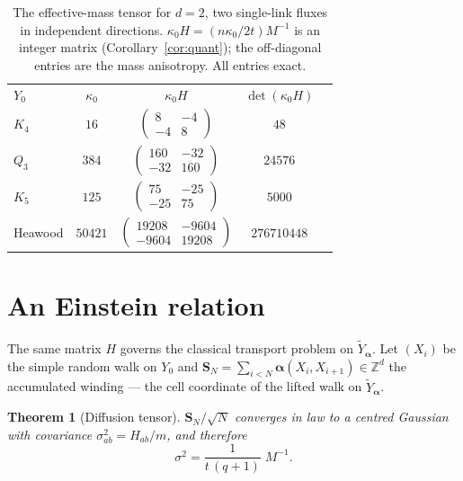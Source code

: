 \documentclass[aps,prb,reprint,amsmath,amssymb,floatfix,superscriptaddress]{revtex4-2}
\theoremstyle{plain}
\newtheorem{theorem}{Theorem}
\theoremstyle{definition}
\theoremstyle{remark}
\newcommand{\Z}{\mathbb{Z}}
\newcommand{\Yt}{\widetilde Y_{\bm\alpha}}
\begin{document}
\begin{table}[t]
\centering
\begin{ruledtabular}
\begin{tabular}{lcccc}
$Y_0$ & $\kappa_0$ & $\kappa_0H$ & $\det(\kappa_0H)$\\
\colrule
$K_4$    & $16$    & $\left(\begin{smallmatrix}8&-4\\-4&8\end{smallmatrix}\right)$ & $48$\\[2pt]
$Q_3$    & $384$   & $\left(\begin{smallmatrix}160&-32\\-32&160\end{smallmatrix}\right)$ & $24576$\\[2pt]
$K_5$    & $125$   & $\left(\begin{smallmatrix}75&-25\\-25&75\end{smallmatrix}\right)$ & $5000$\\[2pt]
Heawood  & $50421$ & $\left(\begin{smallmatrix}19208&-9604\\-9604&19208\end{smallmatrix}\right)$ & $276710448$\\
\end{tabular}
\end{ruledtabular}
\caption{The effective-mass tensor for $d=2$, two single-link fluxes in independent
directions. $\kappa_0H=(n\kappa_0/2t)M^{-1}$ is an integer matrix
(Corollary~\ref{cor:quant}); the off-diagonal entries are the mass anisotropy. All entries
exact.}
\label{tab:tensor}
\end{table}

\section{An Einstein relation}\label{sec:einstein}

The same matrix $H$ governs the classical transport problem on $\Yt$. Let $(X_i)$ be the
simple random walk on $Y_0$ and $\bm S_N=\sum_{i<N}\bm\alpha(X_i,X_{i+1})\in\Z^{d}$ the
accumulated winding --- the cell coordinate of the lifted walk on $\Yt$.

\begin{theorem}[Diffusion tensor]\label{thm:einstein}
$\bm S_N/\sqrt N$ converges in law to a centred Gaussian with covariance
$\sigma^{2}_{ab}=H_{ab}/m$, and therefore
\begin{equation}\label{eq:einstein}
\sigma^{2}=\frac{1}{t\,(q{+}1)}\;M^{-1}.
\end{equation}
\end{theorem}
\end{document}
